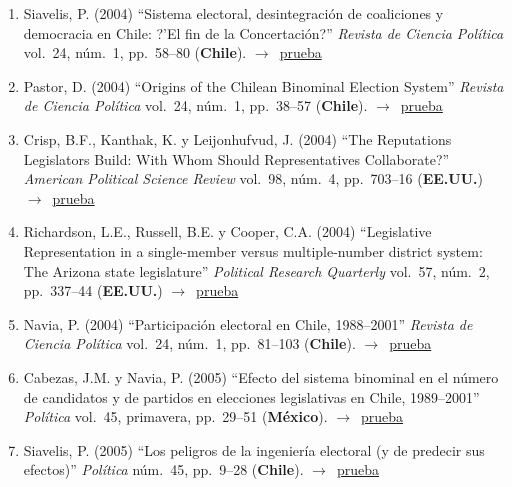 \documentclass[12 pt, letter]{article}
\newenvironment{CitasMiTrabajo}{
    \begin{footnotesize}
    \begin{enumerate}[label={\footnotesize\emph{cita~\arabic*}},ref=\arabic*] %
        \setlength{\itemsep}{.1\itemsep}
        \setlength{\parskip}{.1\parskip}
    }{\end{enumerate}\end{footnotesize}}
\begin{document}
\begin{CitasMiTrabajo}
        \item Siavelis, P. (2004)
        ``Sistema electoral, desintegraci\'on de coaliciones y democracia en Chile: ?'El fin de la Concertaci\'on?''
        \emph{Revista de Ciencia Pol\'itica} vol.\ 24, n\'um.\ 1, pp.\ 58--80  (\textbf{Chile}). $\rightarrow$~\href{http://ericmagar.com/cv/cites/mrs/siavelis2004rcp.pdf}{prueba}

        \item Pastor, D. (2004)
        ``Origins of the Chilean Binominal Election System''
        \emph{Revista de Ciencia Pol\'itica} vol.\ 24, n\'um.\ 1, pp.\ 38--57
        (\textbf{Chile}). $\rightarrow$~\href{http://ericmagar.com/cv/cites/mrs/pastor2004rcp.pdf}{prueba}

        \item Crisp, B.F., Kanthak, K. y Leijonhufvud, J. (2004)
        ``The Reputations Legislators Build: With Whom Should Representatives Collaborate?''
        \emph{American Political Science Review} vol.\ 98, n\'um.\ 4, pp.\ 703--16  (\textbf{EE.UU.}) $\rightarrow$~\href{http://ericmagar.com/cv/cites/mrs/crispEtAl.pdf}{prueba}

        \item Richardson, L.E., Russell, B.E. y Cooper, C.A. (2004)
        ``Legislative
        Representation in a single-member versus multiple-number district system:
        The Arizona state legislature'' \emph{Political Research Quarterly} vol.\ 57, n\'um.\ 2,
        pp.\ 337--44 (\textbf{EE.UU.}) $\rightarrow$~\href{http://ericmagar.com/cv/cites/mrs/richEtal.pdf}{prueba}

        \item Navia, P. (2004)
        ``Participaci\'on electoral en Chile, 1988--2001''
        \emph{Revista de Ciencia Pol\'itica} vol.\ 24, n\'um.\ 1, pp.\ 81--103 (\textbf{Chile}). $\rightarrow$~\href{http://ericmagar.com/cv/cites/mrs/navia2004rcp.pdf}{prueba}

        \item Cabezas, J.M. y Navia, P. (2005)
        ``Efecto del sistema binominal en el n\'umero de candidatos y de partidos en elecciones legislativas en Chile, 1989--2001''
        \emph{Pol\'itica} vol.\ 45, primavera, pp.\ 29--51  (\textbf{M\'exico}). $\rightarrow$~\href{http://ericmagar.com/cv/cites/mrs/cabezas.naviaNcandBinomial2005.pdf}{prueba}

        \item Siavelis, P. (2005)
        ``Los peligros de la ingenier\'ia electoral (y de predecir sus efectos)''
        \emph{Pol\'itica} n\'um.\ 45, pp.\ 9--28  (\textbf{Chile}). $\rightarrow$~\href{http://ericmagar.com/cv/cites/mrs/siavelis2005politica.pdf}{prueba}


\end{CitasMiTrabajo}
\end{document}
